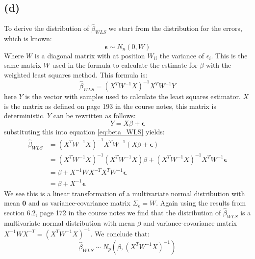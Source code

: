 \documentclass[a4paper]{article}
\begin{document}
\subsection*{(d)}
\noindent {}

To derive the distribution of $\hat{\beta}_{WLS}$ we start from the distribution for the errors, which is known:
\begin{equation*}
	\mathbf{\epsilon} \sim N_n(0, W)
\end{equation*}
Where $W$ is a diagonal matrix with at position $W_{ii}$ the variance of $\epsilon_i$. This is the same matrix $W$ used in the formula to calculate the estimate for $\beta$ with the weighted least squares method. This formula is:
\begin{equation}
	\hat{\beta}_{WLS} = (X^TW^{-1}X)^{-1} X^T W^{-1}Y
	\label{eq:beta_WLS}
\end{equation}
here $Y$ is the vector with samples used to calculate the least squares estimator. $X$ is the matrix as defined on page 193 in the course notes, this matrix is deterministic. $Y$ can be rewritten as follows:
\begin{equation*}
	Y = X \beta + \mathbf{\epsilon}
\end{equation*}
substituting this into equation \ref{eq:beta_WLS} yields:
\begin{align*}
	\hat{\beta}_{WLS} &= (X^TW^{-1}X)^{-1} X^TW^{-1}(X\beta+\mathbf{\epsilon})\\
			  &= (X^TW^{-1}X)^{-1} (X^TW^{-1}X) \beta + (X^TW^{-1}X)^{-1} X^TW^{-1}\mathbf{\epsilon}\\
			  &= \beta + X^{-1} W X^{-T} X^T W^{-1} \mathbf{\epsilon}\\
			  &= \beta + X^{-1} \mathbf{\epsilon} 
\end{align*}
We see this is a linear transformation of a multivariate normal distribution with mean $\mathbf{0}$ and as variance-covariance matrix $\Sigma_{\epsilon}=W$. Again using the results from section 6.2, page 172 in the course notes we find that the distribution of $\hat{\beta}_{WLS}$ is a multivariate normal distribution with mean $\beta$ and variance-covariance matrix $X^{-1} W X^{-T} = (X^T W^{-1} X)^{-1}$. We conclude that:
\begin{equation*}
	\hat{\beta}_{WLS} \sim N_p(\beta, (X^TW^{-1}X)^{-1})
\end{equation*}


\newpage
\end{document}
